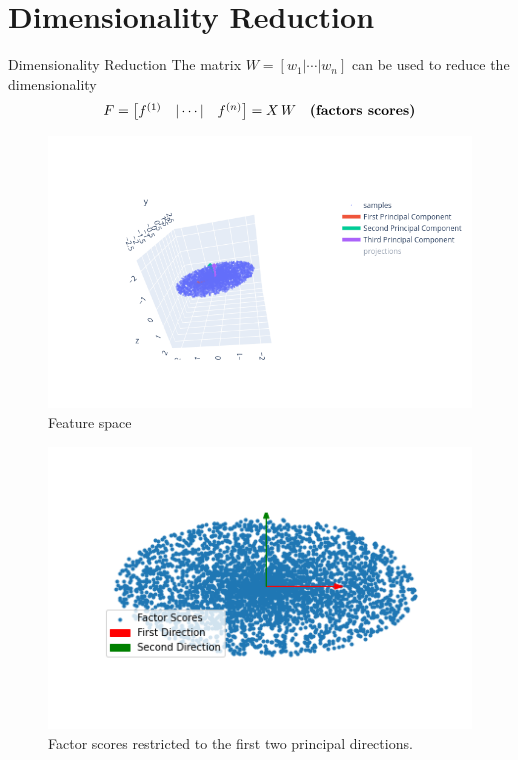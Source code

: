 \documentclass[10pt]{beamer}
\theoremstyle{definition}
\newcommand{\1}{\mathbbm{1}}
\begin{document}
\section{Dimensionality Reduction}
\begin{frame}{Dimensionality Reduction}
  The matrix $W=[w_1|\cdots|w_n]$ can be used to reduce the dimensionality
  \[
    F=
    \begin{bmatrix}
      f^{(1)}&|\cdots|&f^{(n)}
    \end{bmatrix}
    = X\,W\quad\mbox{\bf (factors scores)}
  \]
  \begin{minipage}[t]{0.4\textwidth}
    \begin{figure}[h!]
      \centering
      \includegraphics[clip, scale=0.4, trim=1cm 1.5cm 8cm 4cm]{./pic/PCA_3D.png}
      \caption{Feature space}
    \end{figure}
  \end{minipage}\hfill
  \begin{minipage}[t]{0.5\textwidth}
    \begin{figure}[h!]
      \centering
      \includegraphics[scale=0.3]{./pic/PCA_2D.png}
      \caption{Factor scores restricted to the first two principal
      directions.}
    \end{figure}
  \end{minipage}
\end{frame}
\end{document}
